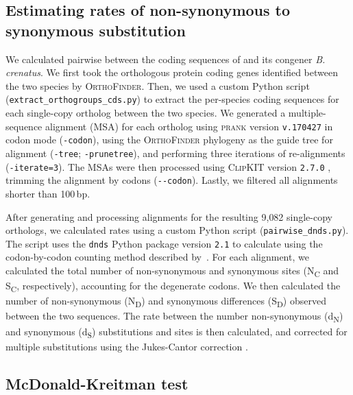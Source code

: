 \subsection*{Estimating rates of non-synonymous to synonymous substitution}

We calculated pairwise \dnds{} between the coding sequences of \bgla{} and its
congener \textit{B. crenatus}. We first took the orthologous protein coding genes
identified between the two species by \textsc{OrthoFinder}.
Then, we used a custom Python script (\texttt{extract\_orthogroups\_cds.py}) to
extract the per-species coding sequences for each single-copy ortholog between the
two species.
We generated a multiple-sequence alignment (MSA) for each ortholog using
\textsc{prank} version \texttt{v.170427} \citep{loytynoja2005_prank} in codon
mode (\texttt{-codon}), using the \textsc{OrthoFinder} phylogeny as the guide
tree for alignment (\texttt{-tree}; \texttt{-prunetree}), and performing three
iterations of re-alignments (\texttt{-iterate=3}).
The MSAs were then processed using \textsc{ClipKIT} version \texttt{2.7.0}
\citep{steenwyk2020_clipkit}, trimming the alignment by codons (\texttt{-{}-codon}).
Lastly, we filtered all alignments shorter than 100\,bp.
\vspace{0.1cm}

After generating and processing alignments for the resulting 9{,}082 single-copy
orthologs, we calculated \dnds{} rates using a custom Python script
(\texttt{pairwise\_dnds.py}).
The script uses the \texttt{dnds} Python package version \texttt{2.1}
\citep{qalieh_dnds} to calculate \dnds{} using the codon-by-codon
counting method described by~\citet{nei1986_dnds}.
For each alignment, we calculated the total number of non-synonymous and
synonymous sites (N\textsubscript{C} and S\textsubscript{C}, respectively),
accounting for the degenerate codons.
We then calculated the number of non-synonymous (N\textsubscript{D}) and
synonymous differences (S\textsubscript{D}) observed between the two sequences.
The rate between the number non-synonymous (d\textsubscript{N}) and synonymous
(d\textsubscript{S}) substitutions and sites is then calculated, and corrected for
multiple substitutions using the Jukes-Cantor correction \citep{JC69}.

\subsection*{McDonald-Kreitman test}

